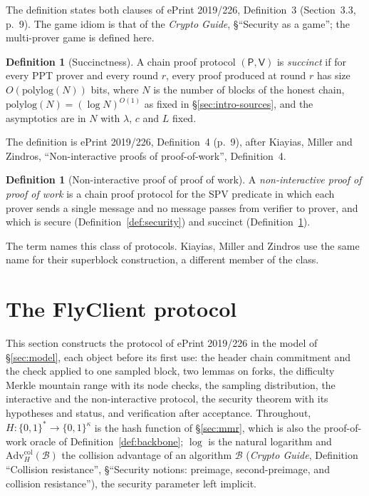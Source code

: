 \documentclass[11pt,a4paper]{article}
\theoremstyle{definition}
\newtheorem{definition}[theorem]{Definition}
\begin{document}
The definition states both clauses of ePrint 2019/226, Definition~3
(Section~3.3, p.~9). The game idiom is that of the \emph{Crypto Guide},
\S``Security as a game''; the multi-prover game is defined here.

\begin{definition}[Succinctness]\label{def:succinct}
A chain proof protocol $(\mathsf{P}, \mathsf{V})$ is \emph{succinct} if for
every PPT prover and every round $r$, every proof produced at round $r$ has
size $O(\mathrm{polylog}(N))$ bits, where $N$ is the number of blocks of the
honest chain, $\mathrm{polylog}(N) = (\log N)^{O(1)}$ as fixed in
\S\ref{sec:intro-sources}, and the asymptotics are in $N$ with $\lambda$,
$c$ and $L$ fixed.
\end{definition}

The definition is ePrint 2019/226, Definition~4 (p.~9), after Kiayias,
Miller and Zindros, ``Non-interactive proofs of proof-of-work'',
Definition~4.

\begin{definition}[Non-interactive proof of proof of work]\label{def:nipopow}
A \emph{non-interactive proof of proof of work} is a chain proof protocol
for the SPV predicate in which each prover sends a single message and no
message passes from verifier to prover, and which is secure
(Definition~\ref{def:security}) and succinct (Definition~\ref{def:succinct}).
\end{definition}

The term names this class of protocols. Kiayias, Miller and Zindros use the
same name for their superblock construction, a different member of the
class.

\section{The FlyClient protocol}\label{sec:protocol}

This section constructs the protocol of ePrint 2019/226 in the model of
\S\ref{sec:model}, each object before its first use: the header chain
commitment and the check applied to one sampled block, two lemmas on forks,
the difficulty Merkle mountain range with its node checks, the sampling
distribution, the interactive and the non-interactive protocol, the security
theorem with its hypotheses and status, and verification after acceptance.
Throughout, $H\colon\{0,1\}^*\to\{0,1\}^\kappa$ is the hash function of
\S\ref{sec:mmr}, which is also the proof-of-work oracle of
Definition~\ref{def:backbone}; $\log$ is the natural logarithm and
$\mathrm{Adv}^{\mathrm{col}}_H(\mathcal{B})$ the collision advantage of an
algorithm $\mathcal{B}$ (\emph{Crypto Guide}, Definition ``Collision
resistance'', \S``Security notions: preimage, second-preimage, and collision
resistance''), the security parameter left implicit.
\end{document}
